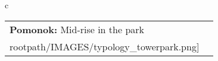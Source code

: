 \begin{table}[H]
        \begin{tabular}{c}
        \begin{tabular}{m{1.5in} m{2in}}
\textbf{Pomonok:} {Mid-rise in the park} & \texttt{[image: \\rootpath/IMAGES/typology\_towerpark.png]}
\end{tabular}\end{tabular}
        \end{table}